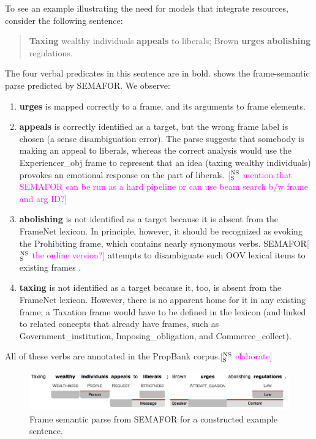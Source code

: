 \documentclass[11pt]{article}
\newcommand{\ensuretext}[1]{#1}
\newcommand{\nssmarker}{\ensuretext{\textcolor{magenta}{\ensuremath{^{\textsc{NS}}_{\textsc{S}}}}}}
\newcommand{\arkcomment}[3]{\ensuretext{\textcolor{#3}{[#1 #2]}}}
\newcommand{\nss}[1]{\arkcomment{\nssmarker}{#1}{magenta}}
\newcommand{\vpred}[1]{\textbf{#1}}
\begin{document}
To see an example illustrating the need for models that integrate resources, consider the following sentence:
\begin{quote}
\vpred{Taxing} wealthy individuals \vpred{appeals} to liberals; Brown \vpred{urges} \vpred{abolishing} regulations.
\end{quote}
The four verbal predicates in this sentence are in bold. 
 shows the frame-semantic parse predicted by SEMAFOR. 
We observe:
\begin{enumerate}
  \item \vpred{urges} is mapped correctly to a frame, and its arguments to frame elements. 
  \item \vpred{appeals} is correctly identified as a target, but the wrong frame label is chosen 
  (a sense disambiguation error). The parse suggests that somebody is making an appeal to liberals, 
  whereas the correct analysis would use the Experiencer\_obj frame to represent that an idea
  (taxing wealthy individuals) provokes an emotional response on the part of liberals. 
  \nss{mention that SEMAFOR can be run as a hard pipeline or can use beam search b/w frame and arg ID?}
  \item \vpred{abolishing} is not identified as a target because it is absent from the FrameNet lexicon. 
  In principle, however, it should be recognized as evoking the Prohibiting frame, which contains 
  nearly synonymous verbs. SEMAFOR\nss{the online version?} attempts to disambiguate such OOV lexical items 
  to existing frames \cite{das-acl2011}.
  \item \vpred{taxing} is not identified as a target because it, too, is absent from the FrameNet lexicon. 
  However, there is no apparent home for it in any existing frame; a Taxation frame would have to be defined 
  in the lexicon (and linked to related concepts that already have frames, such as Government\_institution, 
  Imposing\_obligation, and Commerce\_collect).
\end{enumerate}

All of these verbs are annotated in the PropBank corpus.\nss{elaborate}

\begin{figure}
\includegraphics[width=\textwidth]{tax_example_short.jpg}
\caption{Frame semantic parse from SEMAFOR for a constructed example sentence.}
\label{fig:semaforOutput}
\end{figure}
\end{document}
